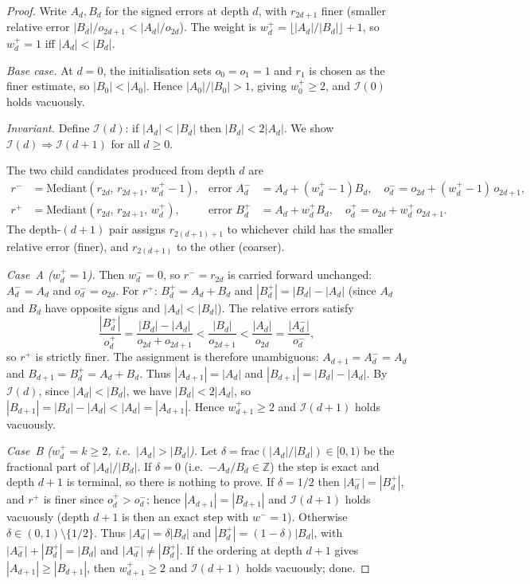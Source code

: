 \documentclass[12pt]{article}
\theoremstyle{definition}
\theoremstyle{remark}
\theoremstyle{plain}
\newcommand{\wminus}{w^{-}}
\begin{document}
\begin{proof}
Write $A_d, B_d$ for the signed errors at depth $d$, with $r_{2d+1}$ finer
(smaller relative error $|B_d|/o_{2d+1} < |A_d|/o_{2d}$).
The weight is $w^+_d = \lfloor|A_d|/|B_d|\rfloor + 1$, so $w^+_d = 1$ iff
$|A_d| < |B_d|$.

\emph{Base case.}
At $d = 0$, the initialisation sets $o_0 = o_1 = 1$ and $r_1$ is chosen as
the finer estimate, so $|B_0| < |A_0|$.  Hence $|A_0|/|B_0| > 1$, giving
$w^+_0 \geq 2$, and $\mathcal{I}(0)$ holds vacuously.

\emph{Invariant.}
Define $\mathcal{I}(d)$: if $|A_d| < |B_d|$ then $|B_d| < 2|A_d|$.
We show $\mathcal{I}(d) \Rightarrow \mathcal{I}(d+1)$ for all $d \geq 0$.

The two child candidates produced from depth $d$ are
\begin{align*}
r^- &= \mathrm{Mediant}(r_{2d},\, r_{2d+1},\, w^+_d - 1),
  & \text{error } A^-_d &= A_d + (w^+_d-1)B_d,
  \quad o^-_d = o_{2d} + (w^+_d-1)\,o_{2d+1},\\
r^+ &= \mathrm{Mediant}(r_{2d},\, r_{2d+1},\, w^+_d),
  & \text{error } B^+_d &= A_d + w^+_d B_d,
  \quad o^+_d = o_{2d} + w^+_d\,o_{2d+1}.
\end{align*}
The depth-$(d+1)$ pair assigns $r_{2(d+1)+1}$ to whichever child has the
smaller relative error (finer), and $r_{2(d+1)}$ to the other (coarser).

\textit{Case~A ($w^+_d = 1$).}
Then $w^-_d = 0$, so $r^- = r_{2d}$ is carried forward unchanged:
$A^-_d = A_d$ and $o^-_d = o_{2d}$.  For $r^+$: $B^+_d = A_d + B_d$ and
$|B^+_d| = |B_d| - |A_d|$ (since $A_d$ and $B_d$ have opposite signs and
$|A_d| < |B_d|$).  The relative errors satisfy
\[
  \frac{|B^+_d|}{o^+_d}
  = \frac{|B_d|-|A_d|}{o_{2d}+o_{2d+1}}
  < \frac{|B_d|}{o_{2d+1}}
  < \frac{|A_d|}{o_{2d}}
  = \frac{|A^-_d|}{o^-_d},
\]
so $r^+$ is strictly finer.  The assignment is therefore unambiguous:
$A_{d+1} = A^-_d = A_d$ and $B_{d+1} = B^+_d = A_d + B_d$.
Thus $|A_{d+1}| = |A_d|$ and $|B_{d+1}| = |B_d| - |A_d|$.
By $\mathcal{I}(d)$, since $|A_d| < |B_d|$, we have $|B_d| < 2|A_d|$,
so $|B_{d+1}| = |B_d| - |A_d| < |A_d| = |A_{d+1}|$.
Hence $w^+_{d+1} \geq 2$ and $\mathcal{I}(d+1)$ holds vacuously.

\textit{Case~B ($w^+_d = k \geq 2$, i.e.\ $|A_d| > |B_d|$).}
Let $\delta = \mathrm{frac}(|A_d|/|B_d|) \in [0,1)$ be the fractional part of
$|A_d|/|B_d|$.
If $\delta = 0$ (i.e.\ $-A_d/B_d \in \mathbb{Z}$) the step is exact and depth $d+1$
is terminal, so there is nothing to prove.
If $\delta = 1/2$ then $|A^-_d| = |B^+_d|$, and $r^+$ is finer since
$o^+_d > o^-_d$; hence $|A_{d+1}| = |B_{d+1}|$ and $\mathcal{I}(d+1)$ holds
vacuously (depth $d+1$ is then an exact step with $\wminus = 1$).
Otherwise $\delta \in (0,1) \setminus \{1/2\}$.
Thus $|A^-_d| = \delta|B_d|$ and $|B^+_d| = (1-\delta)|B_d|$,
with $|A^-_d| + |B^+_d| = |B_d|$ and $|A^-_d| \neq |B^+_d|$.
If the ordering at depth $d+1$ gives $|A_{d+1}| \geq |B_{d+1}|$, then
$w^+_{d+1} \geq 2$ and $\mathcal{I}(d+1)$ holds vacuously; done.


\end{proof}
\end{document}
